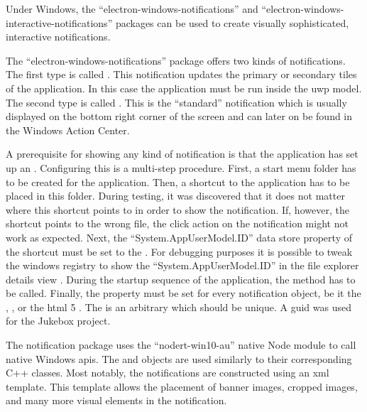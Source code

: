 


Under Windows, the \enquote{electron-windows-notifications} \cite{winNot} and \enquote{electron-windows-interactive-notifications} \cite{winIntNot} packages can be used to create visually sophisticated, interactive notifications.

The \enquote{electron-windows-notifications} package offers two kinds of notifications. The first type is called . This notification updates the primary or secondary tiles of the application. In this case the application must be run inside the \gls{uwp} model. The second type is called . This is the \enquote{standard} notification which is usually displayed on the bottom right corner of the screen and can later on be found in the Windows Action Center.

A prerequisite for showing any kind of notification is that the application has set up an . Configuring this  is a multi-step procedure. First, a start menu folder has to be created for the application. Then, a shortcut to the application has to be placed in this folder. During testing, it was discovered that it does not matter where this shortcut points to in order to show the notification. If, however, the shortcut points to the wrong file, the click action on the notification might not work as expected. Next, the \enquote{System.AppUserModel.ID} data store property of the shortcut must be set to the  \cite{eNotWinAppId}. For debugging purposes it is possible to tweak the windows registry to show the \enquote{System.AppUserModel.ID} in the file explorer details view \cite{showAppId}. During the startup sequence of the application, the  method has to be called. Finally, the  property must be set for every notification object, be it the , , or the \gls{html} 5 . The  is an arbitrary  which should be unique. A \gls{guid} was used for the Jukebox project.

The notification package uses the \enquote{nodert-win10-au} native Node module to call native Windows \gls{api}s. The  and  objects are used similarly to their corresponding C++ classes. Most notably, the notifications are constructed using an \gls{xml} template. This template allows the placement of banner images, cropped images, and many more visual elements in the notification.

